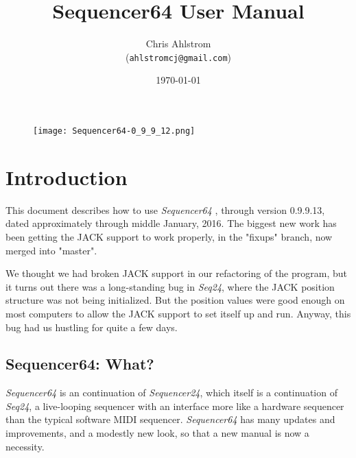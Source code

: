\documentclass[
 11pt,
 twoside,
 a4paper,
 headinclude,
 footinclude,
 final                                 %
]{article}
\begin{document}
\title{Sequencer64 User Manual}
\author{Chris Ahlstrom \\
   (\texttt{ahlstromcj@gmail.com})}
\date{\today}
\maketitle

\begin{figure}[H]
   \centering 
   \texttt{[image: Sequencer64-0\_9\_9\_12.png]}
\end{figure}

\clearpage                             %

\tableofcontents
\listoffigures                         %
\listoftables                          %


\setlength{\parindent}{0pt}
\setlength{\parskip}{1ex plus 0.5ex minus 0.2ex}

\section{Introduction}
\label{sec:introduction}

   This document describes how to use \textsl{Sequencer64}
   \cite{sequencer64},
   through version 0.9.9.13, dated approximately through middle January, 2016.
   The biggest new work has been getting the JACK support to work properly,
   in the "fixups" branch, now merged into "master".

   We thought we had broken JACK support in our refactoring of the program, but
   it turns out there was a long-standing bug in \textsl{Seq24}, where the JACK
   position structure was not being initialized.  But the position values were
   good enough on most computers to allow the JACK support to set itself up and
   run.  Anyway, this bug had us hustling for quite a few days.

\subsection{Sequencer64: What?}
\label{subsec:what_is_sequencer64}

   \textsl{Sequencer64} is an continuation of \textsl{Sequencer24}, 
   which itself is a continuation of \textsl{Seq24},
   a live-looping sequencer with an interface more like a hardware sequencer
   than the typical software MIDI sequencer.
   \textsl{Sequencer64} has many updates and improvements, and a modestly
   new look, so that a new manual is now a necessity.
\end{document}
